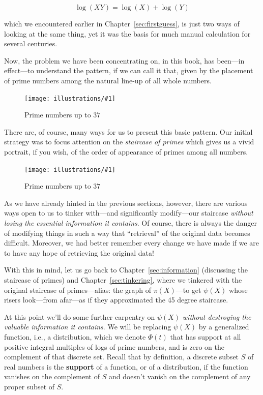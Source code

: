 \documentclass[openany]{book}
\newcommand{\ill}[3]{%
   \begin{figure}[H]%
   \vspace{-2ex}
   \centering%
   \texttt{[image: illustrations/\#1]}%
   \caption{#3}%
   \vspace{-2ex}
    \end{figure}}
\theoremstyle{plain}
\theoremstyle{definition}
\begin{document}
{  $$\log(XY) = \log(X) + \log(Y)$$

  which we encountered earlier in Chapter~\ref{sec:firstguess}, is
  just two ways of looking at the same thing, yet it was the basis for
  much manual calculation for several centuries.




  Now, the problem we have been concentrating on, in this book, has
  been---in effect---to understand the pattern, if we can call it
  that, given by the placement of prime numbers among the natural
  line-up of all whole numbers.
\ill{primes_line}{1}{Prime numbers up to $37$}

 There are, of course, many ways for us to present this basic
 pattern. Our initial strategy was to focus attention on the {\it
   staircase of primes} which gives us a vivid portrait, if you wish,
 of the order of appearance of primes among all numbers.
\ill{PN_38}{.9}{Prime numbers up to $37$}

 As we have already hinted in the previous sections, however, there
 are various ways open to us to tinker with---and significantly
 modify---our staircase {\it without losing the essential information
   it contains}. Of course, there is always the danger of modifying
 things in such a way that ``retrieval'' of the original data becomes
 difficult.  Moreover, we had better remember every change we have
 made if we are to have any hope of retrieving the original data!

 With this in mind, let us go back to Chapter~\ref{sec:information}
 (discussing the staircase of primes) and Chapter~\ref{sec:tinkering},
 where we tinkered with the original staircase of primes---alias: the
 graph of $\pi(X)$---to get $\psi(X)$ whose risers look---from
 afar---as if they approximated the 45 degree staircase.%


   At this point we'll do some further carpentry on $\psi(X)$ {\it without destroying the valuable
   information it contains}. We will be replacing  $\psi(X)$ by a generalized function, i.e., a
   distribution, which we denote $\Phi(t)$ that has support at all positive integral multiples
     of logs of prime numbers, and is  zero on the complement of that discrete set.  Recall that
     by definition, a discrete subset $S$ of real numbers is  the  {\bf support} of a function,
     or of a distribution, if the function vanishes on the complement of  $S$ and doesn't vanish
     on the complement of any proper subset of $S$.

}
\end{document}
